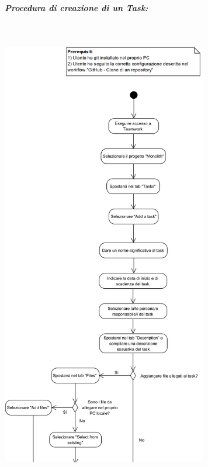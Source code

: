 \begin{samepage}
	\subparagraph{Procedura di creazione di un Task:}\mbox{}\\
	
	\begin{center}
		\includegraphics[width=9cm]{../../documenti/NormeDiProgetto/DiagrammiProcedure/CreazioneTask1.png}
	\end{center}
	
\end{samepage}
